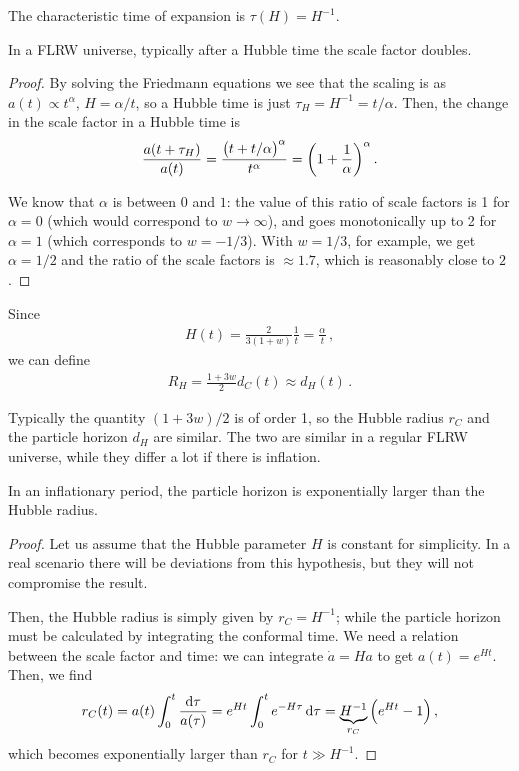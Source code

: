 \documentclass[main.tex]{subfiles}
\begin{document}
The characteristic time of expansion is \(\tau (H ) =H^{-1}\). 

\begin{claim}
In a FLRW universe, typically after a Hubble time the scale factor doubles.
\end{claim}

\begin{proof}
By solving the Friedmann equations we see that the scaling is as \(a(t) \propto t^{\alpha }\), \(H = \alpha /t \), so a Hubble time is just \(\tau _H = H^{-1} = t / \alpha \). Then, the change in the scale factor in a Hubble time is 
%
\begin{align}
\frac{a (t + \tau _H)}{a(t)} = \frac{\qty(t + t/ \alpha )^{\alpha }}{t^{\alpha }} = \qty(1 + \frac{1}{\alpha })^{\alpha }
\,.
\end{align}

We know that \(\alpha \) is between \(0\) and \(1\): the value of this ratio of scale factors is 1 for \(\alpha = 0\) (which would correspond to \(w \to \infty \)), and goes monotonically up to 2 for \(\alpha = 1\) (which corresponds to \(w = -1/3\)).
With \(w = 1/3\), for example, we get \(\alpha = 1/2\) and the ratio of the scale factors is \(\approx \num{1.7}\), which is reasonably close to \(2\).
\end{proof}

Since 
%
\begin{align}
H(t) = \frac{2}{3 (1+w)} \frac{1}{t} = \frac{\alpha}{t}
\,,
\end{align}
%
we can define
%
\begin{align}
R_H = \frac{1 + 3w}{2} d_C (t) \approx d_H (t)
\,.
\end{align}

Typically the quantity \((1+3w) / 2\) is of order 1, so the Hubble radius \(r_C\) and the particle horizon \(d_H\) are similar.
The two are similar in a regular FLRW universe, while they differ a lot if there is inflation. 

\begin{claim}
In an inflationary period, the particle horizon is exponentially larger than the Hubble radius.
\end{claim}

\begin{proof}
Let us assume that the Hubble parameter \(H\) is constant for simplicity. In a real scenario there will be deviations from this hypothesis, but they will not compromise the result. 

Then, the Hubble radius is simply given by \(r_C = H^{-1}\); while the particle horizon must be calculated by integrating the conformal time. 
We need a relation between the scale factor and time: we can integrate \(\dot{a} = H a\) to get \(a(t) = e^{Ht}\). Then, we find 
%
\begin{align}
r_C(t) = a(t) \int_{0}^{t} \frac{ \dd{\tau }}{a(\tau )} = e^{Ht} \int_{0}^{t} e^{-H \tau } \dd{\tau  } = \underbrace{H^{-1}}_{r_C} \qty(e^{Ht} - 1)
\,,
\end{align}
%
which becomes exponentially larger than \(r_C\) for \(t \gg H^{-1}\).
\end{proof}
\end{document}
